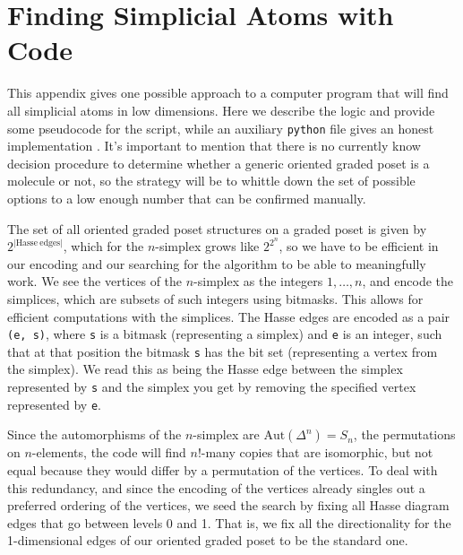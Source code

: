 \documentclass[12pt,a4paper]{article}
\numberwithin{equation}{section}
\begin{document}
\appendix

\section{Finding Simplicial Atoms with Code}\label{app:pseudocode}

This appendix gives one possible approach to a computer program that will find all simplicial atoms in low dimensions. Here we describe the  logic and provide some pseudocode for the script, while an auxiliary \texttt{python} file gives an honest implementation \cite{pythoncode}. It's important to mention that there is no currently know decision procedure to determine whether a generic oriented graded poset is a molecule or not, so the strategy will be to whittle down the set of possible options to a low enough number that can be confirmed manually.

The set of all oriented graded poset structures on a graded poset is given by $2^{|\mathrm{Hasse \ edges}|}$, which for the $n$-simplex grows like $2^{2^n}$, so we have to be efficient in our encoding and our searching for the algorithm to be able to meaningfully work. We see the vertices of the $n$-simplex as the integers $1, \dots, n$, and encode the simplices, which are subsets of such integers using bitmasks. This allows for efficient computations with the simplices. The Hasse edges are encoded as a pair \texttt{(e, s)}, where \texttt{s} is a bitmask (representing a simplex) and \texttt{e} is an integer, such that at that position the bitmask \texttt{s} has the bit set (representing a vertex from the simplex). We read this as being the Hasse edge between the simplex represented by \texttt{s} and the simplex you get by removing the specified vertex represented by \texttt{e}.

Since the automorphisms of the $n$-simplex are $\mathrm{Aut}(\Delta^n) = S_n$, the permutations on $n$-elements, the code will find $n!$-many copies that are isomorphic, but not equal because they would differ by a permutation of the vertices. To deal with this redundancy, and since the encoding of the vertices already singles out a preferred ordering of the vertices, we seed the search by fixing all Hasse diagram edges that go between levels 0 and 1. That is, we fix all the directionality for the 1-dimensional edges of our oriented graded poset to be the standard one.
\end{document}
